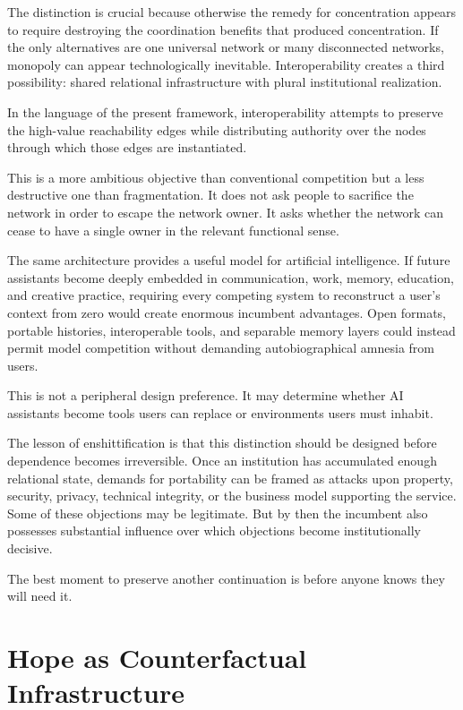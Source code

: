 \documentclass[11pt]{article}
\begin{document}
The distinction is crucial because otherwise the remedy for concentration appears to require destroying the coordination benefits that produced concentration. If the only alternatives are one universal network or many disconnected networks, monopoly can appear technologically inevitable. Interoperability creates a third possibility: shared relational infrastructure with plural institutional realization.

In the language of the present framework, interoperability attempts to preserve the high-value reachability edges while distributing authority over the nodes through which those edges are instantiated.

This is a more ambitious objective than conventional competition but a less destructive one than fragmentation. It does not ask people to sacrifice the network in order to escape the network owner. It asks whether the network can cease to have a single owner in the relevant functional sense.

The same architecture provides a useful model for artificial intelligence. If future assistants become deeply embedded in communication, work, memory, education, and creative practice, requiring every competing system to reconstruct a user's context from zero would create enormous incumbent advantages. Open formats, portable histories, interoperable tools, and separable memory layers could instead permit model competition without demanding autobiographical amnesia from users.

This is not a peripheral design preference. It may determine whether AI assistants become tools users can replace or environments users must inhabit.

The lesson of enshittification is that this distinction should be designed before dependence becomes irreversible. Once an institution has accumulated enough relational state, demands for portability can be framed as attacks upon property, security, privacy, technical integrity, or the business model supporting the service. Some of these objections may be legitimate. But by then the incumbent also possesses substantial influence over which objections become institutionally decisive.

The best moment to preserve another continuation is before anyone knows they will need it.

\section{Hope as Counterfactual Infrastructure}
\end{document}
